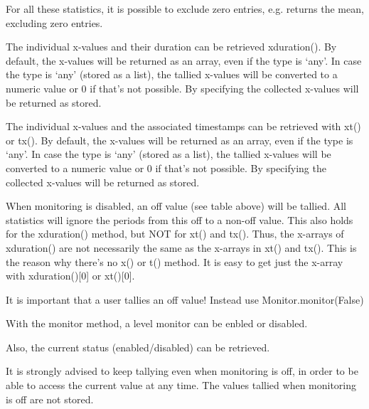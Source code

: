 \documentclass[letterpaper,10pt,english]{sphinxmanual}
\begin{document}
For all these statistics, it is possible to exclude zero entries, e.g.  returns the mean, excluding zero entries.

The individual x-values and their duration can be retrieved xduration(). By default, the x-values will be returned as an array, even if
the type is ‘any’. In case the type is ‘any’ (stored as a list), the tallied x-values will be converted to a numeric value or 0 if
that’s not possible. By specifying  the collected x-values will be returned as stored.

The individual x-values and the associated timestamps can be retrieved with xt() or tx(). By default, the x-values will be returned as an array, even if
the type is ‘any’. In case the type is ‘any’ (stored as a list), the tallied x-values will be converted to a numeric value or 0 if
that’s not possible. By specifying  the collected x-values will be returned as stored.

When monitoring is disabled, an off value (see table above) will be tallied. All statistics will ignore the periods from this
off to a non-off value. This also holds for the xduration() method, but NOT for xt() and tx(). Thus,
the x-arrays of xduration() are not necessarily the same as the x-arrays in xt() and tx(). This is
the reason why there’s no x() or t() method. 
It is easy to get just the x-array with xduration(){[}0{]} or xt(){[}0{]}.

It is important that a user  tallies an off value! Instead use Monitor.monitor(False)

With the monitor method, a level monitor can be enbled or disabled.

Also, the current status (enabled/disabled) can be retrieved.

\begin{sphinxVerbatim}[commandchars=\\\{\}]
  
  
 
\end{sphinxVerbatim}

It is strongly advised to keep tallying even when monitoring is off, in order to be able to access the current value at any time. The values tallied when monitoring is off
are not stored.
\end{document}
